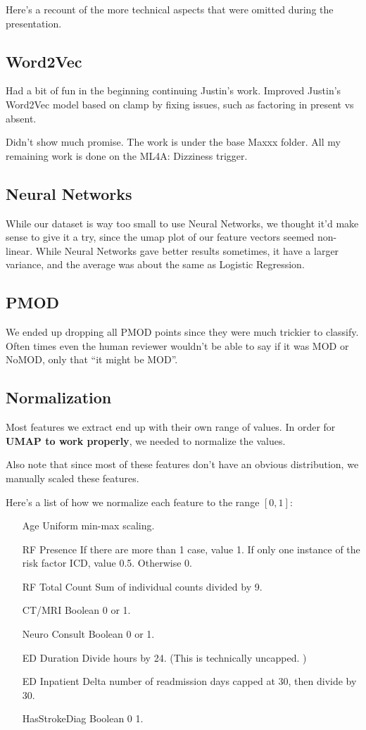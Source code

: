 \documentclass[12pt]{article}
\theoremstyle{definition}
\begin{document}
Here's a recount of the more technical aspects that were omitted during the presentation.

\subsection{Word2Vec}
Had a bit of fun in the beginning continuing Justin's work. Improved Justin's Word2Vec model based on clamp by fixing issues, such as factoring in present vs absent.

Didn't show much promise. The work is under the base Maxxx folder. All my remaining work is done on the ML4A: Dizziness trigger.

\subsection{Neural Networks}
While our dataset is way too small to use Neural Networks, we thought it'd make sense to give it a try, since the umap plot of our feature vectors seemed non-linear. While Neural Networks gave better results sometimes, it have a larger variance, and the average was about the same as Logistic Regression.

\subsection{PMOD}
We ended up dropping all PMOD points since they were much trickier to classify. Often times even the human reviewer wouldn't be able to say if it was MOD or NoMOD, only that ``it might be MOD''.

\subsection{Normalization}
Most features we extract end up with their own range of values. In order for \textbf{UMAP to work properly}, we needed to normalize the values. 

Also note that since most of these features don't have an obvious distribution, we manually scaled these features.

Here's a list of how we normalize each feature to the range $[0,1]$:
\begin{itemize}
    \item[Age] Uniform min-max scaling.
    \item[RF Presence] If there are more than 1 case, value 1. If only one instance of the risk factor ICD, value 0.5. Otherwise 0.
    \item[RF Total Count] Sum of individual counts divided by 9.
    \item[CT/MRI] Boolean 0 or 1.
    \item[Neuro Consult] Boolean 0 or 1.  
    \item[ED Duration] Divide hours by 24. (This is technically uncapped. )
    \item[ED Inpatient Delta] number of readmission days capped at 30, then divide by 30.
    \item[HasStrokeDiag] Boolean 0 1. 
\end{itemize}
\end{document}
